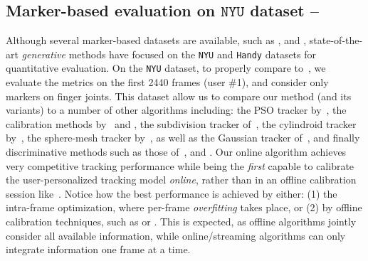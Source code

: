
\subsection{Marker-based evaluation on $\texttt{NYU}$ dataset --
}
\label{sec:evalnyu}
Although several marker-based datasets are available, such as \cite{qian2014realtime}, \cite{sharp2015accurate} and \cite{yuan2017bighand}, state-of-the-art \emph{generative} methods have focused on the \texttt{NYU} \cite{tompson2014real} and \texttt{Handy} \cite{tkach2016sphere} datasets for quantitative evaluation. 
On the \texttt{NYU} dataset, to properly compare to~, we evaluate the metrics on the first 2440 frames (user \#1), and consider only markers on finger joints.
%
This dataset allow us to compare our method (and its variants) to a number of other algorithms including: the PSO tracker by~, the calibration methods by~ and , the subdivision tracker of~, the cylindroid tracker by~, the sphere-mesh tracker by~, as well as the Gaussian tracker of~, and finally discriminative methods such as those of~,  and . 
% 
% 
Our online algorithm achieves very competitive tracking performance while being the \emph{first} capable to calibrate the user-personalized tracking model \emph{online}, rather than in an offline calibration session like~. 
% 
Notice how the best performance is achieved by either: (1) the intra-frame optimization, where per-frame \emph{overfitting} takes place, or (2) by offline calibration techniques, such as \OfflineSoft{} or \cite{taylor2016joint}. This is expected, as offline algorithms jointly consider all available information, while online/streaming algorithms can only integrate information one frame at a time.


